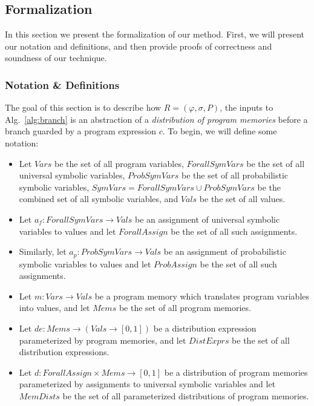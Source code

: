 \documentclass[acmsmall,review]{acmart}\settopmatter{}
\begin{document}
	
	\subsection{Formalization}
	\label{sec:formalization}
	
	In this section we present the formalization of our method. First, we will present our notation and definitions, and then provide proofs of correctness and soundness of our technique.
	
	\subsubsection{Notation \& Definitions}
	\label{sec:notation}
	
	The goal of this section is to describe how $R=(\varphi,\sigma,P)$, the inputs to Alg.~\ref{alg:branch} is an abstraction of a \textit{distribution of program memories} before a branch guarded by a program expression $c$.
	To begin, we will define some notation:
	\begin{itemize}
		\item Let $Vars$ be the set of all program variables, $ForallSymVars$ be the set of all universal symbolic variables, $ProbSymVars$ be the set of all probabilistic symbolic variables, $SymVars = ForallSymVars \cup ProbSymVars$ be the combined set of all symbolic variables, and $Vals$ be the set of all values. 
		\item Let $a_f: ForallSymVars \rightarrow Vals$ be an assignment of universal symbolic variables to values and let $ForallAssign$ be the set of all such assignments.
		\item Similarly, let $a_p : ProbSymVars \rightarrow Vals$ be an assignment of probabilistic symbolic variables to values and let $ProbAssign$ be the set of all such assignments.
		\item Let $m : Vars \rightarrow Vals$ be a program memory which translates program variables into values, and let $Mems$ be the set of all program memories.
		\item Let $de : Mems \rightarrow (Vals \rightarrow [0,1])$ be a distribution expression parameterized by program memories, and let $DistExprs$ be the set of all distribution expressions.
		\item Let $d : ForallAssign \times Mems \rightarrow [0,1]$ be a distribution of program memories parameterized by assignments to universal symbolic variables and let $MemDists$ be the set of all parameterized distributions of program memories.
	\end{itemize}
	
\end{document}
